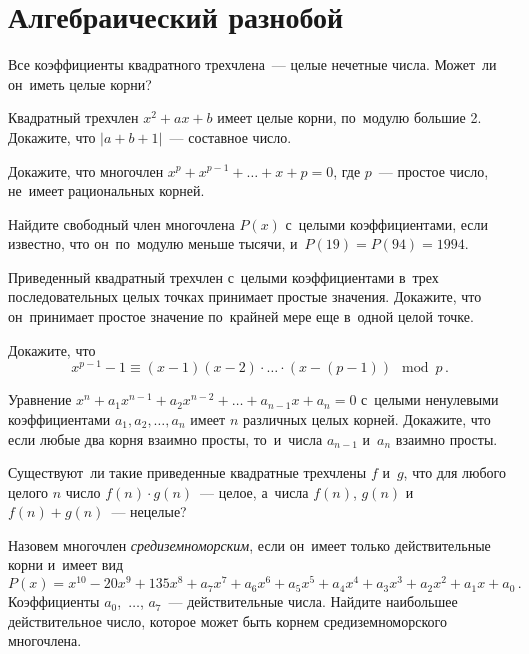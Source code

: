 
\section*{Алгебраический разнобой}


\begin{problems}

\item
Все коэффициенты квадратного трехчлена~--- целые нечетные числа.
Может~ли он~иметь целые корни?

\item
Квадратный трехчлен $x^2 + a x + b$ имеет целые корни, по~модулю большие 2.
Докажите, что $|a + b + 1|$~--- составное число.

\item
Докажите, что многочлен $x^p + x^{p-1} + \ldots + x + p = 0$, где $p$~---
простое число, не~имеет рациональных корней.

\item
Найдите свободный член многочлена $P(x)$ с~целыми коэффициентами, если
известно, что он~по~модулю меньше тысячи, и~$P(19) = P(94) = 1994$.

\item
Приведенный квадратный трехчлен с~целыми коэффициентами в~трех последовательных
целых точках принимает простые значения.
Докажите, что он~принимает простое значение по~крайней мере еще в~одной целой
точке.

\item
Докажите, что
\[
    x^{p-1} - 1
\equiv
    (x - 1) (x - 2) \cdot \ldots \cdot (x - (p-1))
\mod p
\, . \]

\item
Уравнение $x^n + a_1 x^{n-1} + a_2 x^{n-2} + \ldots + a_{n-1} x + a_n = 0$
с~целыми ненулевыми коэффициентами $a_1, a_2, \ldots, a_n$ имеет $n$ различных
целых корней.
Докажите, что если любые два корня взаимно просты, то~и~числа $a_{n-1}$ и~$a_n$
взаимно просты.

\item
Существуют~ли такие приведенные квадратные трехчлены $f$ и~$g$, что для любого
целого $n$ число $f(n) \cdot g(n)$~--- целое, а~числа $f(n)$, $g(n)$
и~$f(n) + g(n)$~--- нецелые?

\item
Назовем многочлен \emph{средиземноморским}, если он~имеет только действительные
корни и~имеет вид
\[
    P(x)
=
    x^{10} - 20 x^9 + 135 x^8 +
    a_7 x^7 + a_6 x^6 + a_5 x^5 + a_4 x^4 + a_3 x^3 + a_2 x^2 + a_1 x + a_0
\, . \]
Коэффициенты $a_0$,~$\ldots$, $a_7$~--- действительные числа.
Найдите наибольшее действительное число, которое может быть корнем
средиземноморского многочлена.

\end{problems}


